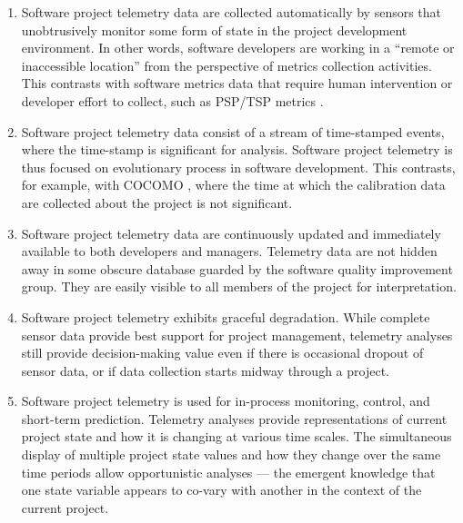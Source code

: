 \begin{enumerate}
  \item Software project telemetry data are collected automatically by sensors that unobtrusively monitor some form of state in the project development environment.  In other words, software developers are working in a ``remote or inaccessible location'' from the perspective of metrics collection activities. This contrasts with software metrics data that require human intervention or developer effort to collect, such as PSP/TSP metrics \cite{Humphrey:1995}.
  
  \item Software project telemetry data consist of a stream of time-stamped events, where the time-stamp is significant for analysis. Software project telemetry is thus focused on evolutionary process in software development.  This contrasts, for example, with COCOMO \cite{Cocomo:1981, Cocomo:2000}, where the time at which the calibration data are collected about the project is not significant.
  
  \item Software project telemetry data are continuously updated and immediately available to both developers and managers. Telemetry data are not hidden away in some obscure database guarded by the software quality improvement group. They are easily visible to all members of the project for interpretation. 

  \item Software project telemetry exhibits graceful degradation. While complete sensor data provide best support for project management, telemetry analyses still provide decision-making value even if there is occasional dropout of sensor data, or if data collection starts midway through a project.      
  
  \item Software project telemetry is used for in-process monitoring, control, and short-term prediction. Telemetry analyses provide representations of current project state and how it is changing at various time scales. The simultaneous display of multiple project state values and how they change over the same time periods allow opportunistic analyses --- the emergent knowledge that one state variable appears to co-vary with another in the context of the current project.
  
\end{enumerate}





